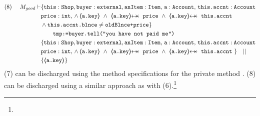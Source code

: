 \begin{proofO}
\begin{align*}
\text{(8)}  \ \ \ \ M_{good} \vdash & \{  \prg{this}:\prg{Shop}, \prg{buyer} : \prg{external}, \prg{anItem} : \prg{Item},\, \prg{a}:\prg{Account},\, \prg{this.accnt}:\prg{Account}\\
				& \prg{price} : \prg{int},\,
				  \wedge\, 
				  {\inside{\prg{a.key}}}\ \wedge\ 
				  \protectedFrom{\prg{a.key}}{\prg{price}}\ \wedge\ 
				   \protectedFrom{\prg{a.key}}{\prg{this.accnt}} \\
				& \wedge \prg{this.accnt.blnce} \neq \prg{oldBlnce+price}\} \\
		  		&\SPT  \prg{tmp:=buyer.tell("you have not paid me")}\ \\  
		  		& \{  \prg{this}:\prg{Shop}, \prg{buyer} : \prg{external}, \prg{anItem} : \prg{Item},\, \prg{a}:\prg{Account},\, \prg{this.accnt}:\prg{Account}\\
				& \prg{price} : \prg{int},\,
				  \wedge\, 
				  {\inside{\prg{a.key}}}\ \wedge\ 
				  \protectedFrom{\prg{a.key}}{\prg{price}}\ \wedge\ 
				   \protectedFrom{\prg{a.key}}{\prg{this.accnt}}\ \} \ \ \  || \ \ \ \\
		  		& \{ {\inside{\prg{a.key}}} \}
\end{align*}
\normalsize
(7) can be discharged using the method specifications for the private method . (8) can be discharged using a similar approach as with (6).\footnote{}


\end{proofO}
